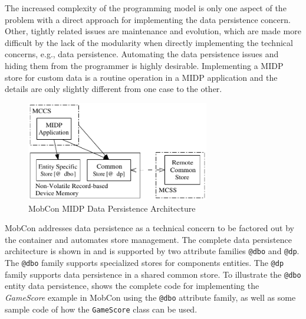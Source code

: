 The increased complexity of the programming model is only one aspect of the problem with a direct approach for implementing the data persistence concern. Other, tightly related issues are maintenance and evolution, which are made more difficult by the lack of the modularity when directly implementing the technical concerns, e.g., data persistence.
Automating the data persistence issues and hiding them from the programmer is highly desirable. Implementing a MIDP store for custom data is a routine operation in a MIDP application and the details are only slightly different from one case to the other.

\begin{figure}[ht]
	\begin{center}
		\includegraphics[width=8cm,height=!]{ch05/dp}
	\end{center}
	\caption{MobCon MIDP Data Persistence Architecture}
	\label{fig:mc.dp}
\end{figure}

MobCon addresses data persistence as a technical concern to be factored out by the container and automates store management. The complete data persistence architecture is shown in  and is supported by two attribute families \texttt{@dbo} and \texttt{@dp}. The \texttt{@dbo} family supports specialized stores for components entities. The \texttt{@dp} family supports data persistence in a shared common store. To illustrate the \texttt{@dbo} entity data persistence,  shows the complete code for implementing the \textit{GameScore} example in MobCon using the \texttt{@dbo} attribute family, as well as some sample code of how the \texttt{Ga\-me\-Sco\-re} class can be used. 

